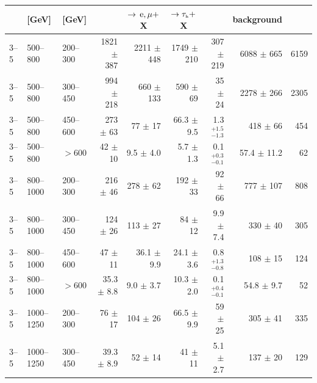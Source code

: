 \begin{table}[!hp]
{\begin{tabular}{lll|r|r|r|r|r|r}
      \NJets{} & \HT{} [GeV] &\MHT{} [GeV]
      & \multicolumn{1}{c|}{} 
      & \multicolumn{1}{c|}{$\to \,\text{e},\mu+$X}
      & \multicolumn{1}{c|}{$\to \tau_{\mbox{\tiny h}}+$X}  
      & \multicolumn{1}{c|}{}
      & \multicolumn{1}{c|}{background}  
      & \multicolumn{1}{c}{}  \\ 
      \hline
      3--5     & 500--800    & 200--300  & 1821   $\pm$  387         & 2211   $\pm$  448        &1749   $\pm$  210        & 307  $\pm$  219         & 6088   $\pm$  665      &  6159  \\
      3--5     & 500--800    & 300--450  &  994   $\pm$  218         &  660   $\pm$  133        & 590   $\pm$   69        & 35   $\pm$   24         & 2278   $\pm$  266      &  2305  \\
      3--5     & 500--800    & 450--600  &  273   $\pm$   63         &   77   $\pm$   17        &  66.3 $\pm$   9.5       &  1.3 $^{+1.5}_{-1.3}$       & 418    $\pm$   66      &   454  \\
      3--5     & 500--800    & $>600$   &   42   $\pm$   10         &   9.5 $\pm$    4.0       &   5.7 $\pm$   1.3       &  0.1 $^{+0.3}_{-0.1}$       & 57.4   $\pm$   11.2    &    62  \\ \hline
      3--5     & 800--1000   & 200--300  &  216   $\pm$   46         &  278   $\pm$   62        & 192   $\pm$   33        & 92   $\pm$   66         & 777    $\pm$  107      &   808  \\
      3--5     & 800--1000   & 300--450  &  124   $\pm$   26         &  113   $\pm$   27        &  84   $\pm$   12        &  9.9 $\pm$    7.4       & 330    $\pm$   40      &   305  \\
      3--5     & 800--1000   & 450--600  &   47   $\pm$   11         &   36.1 $\pm$    9.9      &  24.1 $\pm$    3.6      &  0.8 $^{+1.3}_{-0.8}$       & 108    $\pm$   15      &   124  \\
      3--5     & 800--1000   & $>600$   &   35.3 $\pm$    8.8       &    9.0 $\pm$    3.7      &  10.3 $\pm$    2.0      &  0.1 $^{+0.4}_{-0.1}$       & 54.8   $\pm$   9.7     &    52  \\ \hline
      3--5     & 1000--1250  & 200--300  &   76   $\pm$   17         &  104   $\pm$   26        &  66.5 $\pm$    9.9      & 59   $\pm$   25         & 305    $\pm$   41      &   335  \\
      3--5     & 1000--1250  & 300--450  &   39.3 $\pm$    8.9       &   52   $\pm$   14        &  41   $\pm$   11        &  5.1 $\pm$    2.7       & 137    $\pm$   20      &   129  \\

\end{tabular}}
\end{table}
